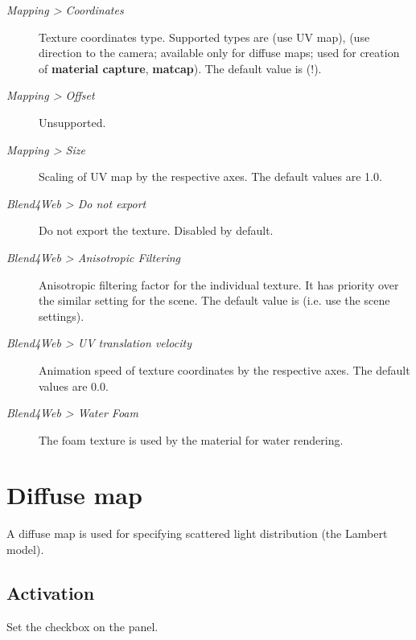 \documentclass[a4paper,12pt,oneside]{sphinxmanual}
\begin{document}
\begin{description}
\item[{\emph{Mapping \textgreater{} Coordinates}}] \leavevmode
Texture coordinates type. Supported types are  (use UV map),  (use direction to the camera; available only for diffuse maps; used for creation of \textbf{material capture}, \textbf{matcap}). The default value is  (!).

\item[{\emph{Mapping \textgreater{} Offset}}] \leavevmode
Unsupported.

\item[{\emph{Mapping \textgreater{} Size}}] \leavevmode
Scaling of UV map by the respective axes. The default values are 1.0.

\item[{\emph{Blend4Web \textgreater{} Do not export}}] \leavevmode
Do not export the texture. Disabled by default.

\item[{\emph{Blend4Web \textgreater{} Anisotropic Filtering}}] \leavevmode
Anisotropic filtering factor for the individual texture. It has priority over the similar setting for the scene. The default value is  (i.e. use the scene settings).

\item[{\emph{Blend4Web \textgreater{} UV translation velocity}}] \leavevmode
Animation speed of texture coordinates by the respective axes. The default values are 0.0.

\item[{\emph{Blend4Web \textgreater{} Water Foam}}] \leavevmode
The foam texture is used by the material for water rendering.

\end{description}


\section{Diffuse map}
\label{textures:index-4}\label{textures:diffuse-map}
A diffuse map is used for specifying scattered light distribution (the Lambert model).


\subsection{Activation}
\label{textures:id4}
Set the  checkbox on the  panel.
\end{document}
